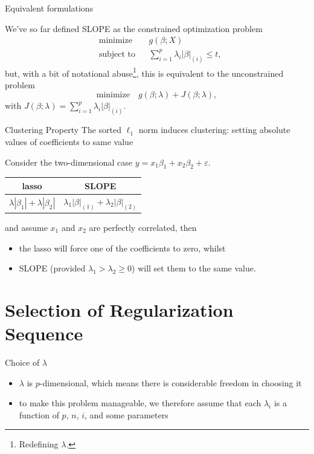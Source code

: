 \documentclass[10pt]{beamer}
\begin{document}
\begin{frame}{Equivalent formulations}

We've so far defined SLOPE as the \alert{constrained} optimization problem
\[
\begin{aligned}
    &\text{minimize}   && g(\beta; X) \\
    &\text{subject to} && \sum_{i=1}^p \lambda_i \lvert \beta \rvert_{(i)} \leq t,
\end{aligned}
\]
but, with a bit of notational abuse\footnote{Redefining \(\lambda\).}, this is equivalent to the \alert{unconstrained} problem
\[
\text{minimize} \quad g(\beta;\lambda) + J(\beta;\lambda),
\]
with \(J(\beta;\lambda) = \sum_{i=1}^p \lambda_i|\beta|_{(i)}\).
\end{frame}

\begin{frame}{Clustering Property}
    The sorted \(\ell_1\) norm induces clustering: setting absolute values of coefficients
    to same value\medskip
    
    Consider the two-dimensional case \(y = x_1\beta_1 + x_2\beta_2 + \varepsilon\).
    \begin{table}[htb]
        \centering
        
        \begin{tabular}{cc}
            \toprule
             lasso & SLOPE \\
             \midrule
             \(\lambda|\beta_1| + \lambda|\beta_2|\) & \(\lambda_1 |\beta|_{(1)} + \lambda_2 |\beta|_{(2)}\)\\
             \bottomrule
        \end{tabular}
    \end{table}
    and assume \(x_1\) and \(x_2\) are perfectly correlated, then
    \begin{itemize}
        \item the lasso will force one of the coefficients to zero, whilst
        \item SLOPE (provided \(\lambda_1 > \lambda_2 \geq 0\)) will set them to the same value.
    \end{itemize}
\end{frame}

\section{Selection of Regularization Sequence}

\begin{frame}[fragile]{Choice of \(\lambda\)}
\begin{itemize}
    \item \(\lambda\) is \(p\)-dimensional, which means there is \alert{considerable} 
          freedom in choosing it
    \item to make this problem manageable, we therefore assume that each \(\lambda_i\)
          is a function of \(p\), \(n\), \(i\), and some parameters
\end{itemize}
\end{frame}
\end{document}
